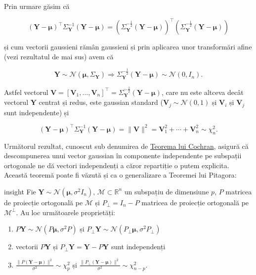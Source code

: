 \documentclass[]{article}
\newenvironment{frshaded_insight*}{%
  \def\FrameCommand{\fboxrule=\FrameRule\fboxsep=\FrameSep \fcolorbox{framecolor_insight}{shadecolor_insight}}%
  \MakeFramed {\advance\hsize-\width \FrameRestore}}%
{\endMakeFramed}
\newenvironment{rmdblock_insight}[1]
  {\begin{frshaded_insight*}
  \begin{itemize}
  \renewcommand{\labelitemi}{
    \raisebox{-.7\height}[0pt][0pt]{
      {\setkeys{Gin}{width=2em,keepaspectratio}\texttt{[image: images/icons/\#1]}}
    }
  }
  \item
  }
  {
  \end{itemize}
  \end{frshaded_insight*}
  }
\newenvironment{rmdinsight}
  {\begin{rmdblock_insight}{insight}}
  {\end{rmdblock_insight}}
\begin{document}
Prin urmare găsim că

\[
(\boldsymbol Y - \boldsymbol \mu)^\intercal \Sigma_{\boldsymbol Y}^{-1}(\boldsymbol Y - \boldsymbol \mu) = \left(\Sigma_{\boldsymbol Y}^{-\frac{1}{2}}(\boldsymbol Y - \boldsymbol \mu)\right)^\intercal\left(\Sigma_{\boldsymbol Y}^{-\frac{1}{2}}(\boldsymbol Y - \boldsymbol \mu)\right) 
\]

și cum vectorii gaussieni rămân gaussieni și prin aplicarea unor
transformări afine (vezi rezultatul de mai sus) avem că

\[
\boldsymbol Y \sim\mathcal{N}(\boldsymbol\mu, \Sigma_{\boldsymbol Y}) \Longrightarrow \Sigma_{\boldsymbol Y}^{-\frac{1}{2}}(\boldsymbol Y - \boldsymbol \mu) \sim\mathcal{N}(0, I_n).
\]

Astfel vectorul
\(\boldsymbol V = [\boldsymbol V_1,\ldots,\boldsymbol V_n]^\intercal = \Sigma_{\boldsymbol Y}^{-\frac{1}{2}}(\boldsymbol Y - \boldsymbol \mu)\),
care nu este altceva decât vectorul \(\boldsymbol Y\) centrat și redus,
este gaussian standard (\(\boldsymbol V_j\sim\mathcal{N}(0,1)\) și
\(\boldsymbol V_i\) și \(\boldsymbol V_j\) sunt independente) și

\[
(\boldsymbol Y - \boldsymbol \mu)^\intercal \Sigma_{\boldsymbol Y}^{-1}(\boldsymbol Y - \boldsymbol \mu) = \lVert \boldsymbol V\rVert^2 = \boldsymbol V_1^2 + \cdots + \boldsymbol V_n^2\sim\chi^2_n.
\]

Următorul rezultat, cunoscut sub denumirea de
\href{https://en.wikipedia.org/wiki/Cochran\%27s_theorem}{Teorema lui
Cochran}, asigură că descompunerea unui vector gaussian în componente
independente pe subspații ortogonale ne dă vectori independenți a căror
repartiție o putem explicita. Această teoremă poate fi văzută și ca o
generalizare a Teoremei lui Pitagora:

\begin{rmdinsight}
Fie \(\boldsymbol Y \sim\mathcal{N}(\boldsymbol\mu, \sigma^2 I_n)\),
\(\mathcal{M}\subset\mathbb{R}^n\) un subspațiu de dimensiune \(p\),
\(P\) matricea de proiecție ortogonală pe \(\mathcal{M}\) și
\(P_\perp = I_n - P\) matricea de proiecție ortogonală pe
\(\mathcal{M}^\perp\). Au loc următoarele proprietăți:

\begin{enumerate}
\def\labelenumi{\arabic{enumi}.}
\item
  \(P\boldsymbol Y\sim\mathcal{N}(P\boldsymbol\mu, \sigma^2 P)\) și
  \(P_\perp\boldsymbol Y\sim\mathcal{N}(P_\perp\boldsymbol\mu, \sigma^2 P_\perp)\)
\item
  vectorii \(P\boldsymbol Y\) și
  \(P_\perp\boldsymbol Y = \boldsymbol Y - P\boldsymbol Y\) sunt
  independenți
\item
  \(\frac{\lVert P(\boldsymbol Y - \boldsymbol\mu)\rVert^2}{\sigma^2}\sim\chi_p^2\)
  și
  \(\frac{\lVert P_\perp(\boldsymbol Y - \boldsymbol\mu)\rVert^2}{\sigma^2}\sim\chi_{n-p}^2\).
\end{enumerate}
\end{rmdinsight}
\end{document}
